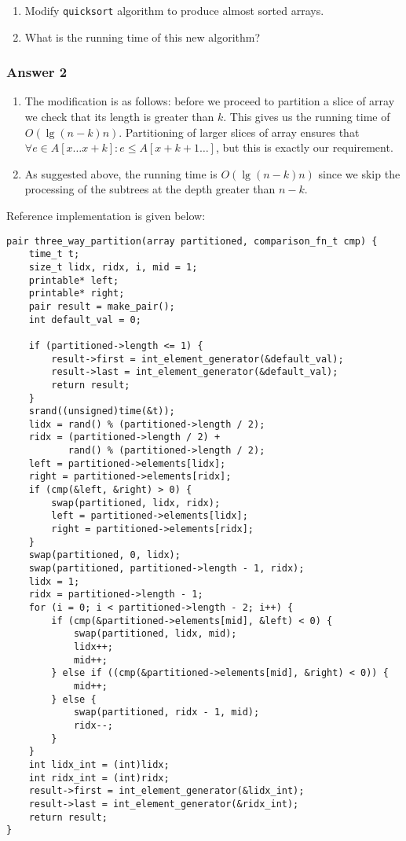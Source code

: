 \documentclass[11pt]{article}
\begin{document}
\begin{enumerate}
\item Modify \texttt{quicksort} algorithm to produce almost sorted arrays.
\item What is the running time of this new algorithm?
\end{enumerate}

\subsubsection{Answer 2}
\label{sec-1-2-1}
\begin{enumerate}
\item The modification is as follows: before we proceed to partition a slice of
array we check that its length is greater than $k$.  This gives us the
running time of $O(\lg(n-k)n)$.  Partitioning of larger slices of
array ensures that $\forall e \in A[x\dots x+k]: e \leq A[x+k+1\dots]$,
but this is exactly our requirement.
\item As suggested above, the running time is $O(\lg(n-k)n)$ since we skip
the processing of the subtrees at the depth greater than $n-k$.
\end{enumerate}

Reference implementation is given below:

\lstset{language=C,label= ,caption= ,numbers=none}
\begin{lstlisting}
pair three_way_partition(array partitioned, comparison_fn_t cmp) {
    time_t t;
    size_t lidx, ridx, i, mid = 1;
    printable* left;
    printable* right;
    pair result = make_pair();
    int default_val = 0;

    if (partitioned->length <= 1) {
        result->first = int_element_generator(&default_val);
        result->last = int_element_generator(&default_val);
        return result;
    }
    srand((unsigned)time(&t));
    lidx = rand() % (partitioned->length / 2);
    ridx = (partitioned->length / 2) +
           rand() % (partitioned->length / 2);
    left = partitioned->elements[lidx];
    right = partitioned->elements[ridx];
    if (cmp(&left, &right) > 0) {
        swap(partitioned, lidx, ridx);
        left = partitioned->elements[lidx];
        right = partitioned->elements[ridx];
    }
    swap(partitioned, 0, lidx);
    swap(partitioned, partitioned->length - 1, ridx);
    lidx = 1;
    ridx = partitioned->length - 1;
    for (i = 0; i < partitioned->length - 2; i++) {
        if (cmp(&partitioned->elements[mid], &left) < 0) {
            swap(partitioned, lidx, mid);
            lidx++;
            mid++;
        } else if ((cmp(&partitioned->elements[mid], &right) < 0)) {
            mid++;
        } else {
            swap(partitioned, ridx - 1, mid);
            ridx--;
        }
    }
    int lidx_int = (int)lidx;
    int ridx_int = (int)ridx;
    result->first = int_element_generator(&lidx_int);
    result->last = int_element_generator(&ridx_int);
    return result;
}
\end{lstlisting}
\end{document}
